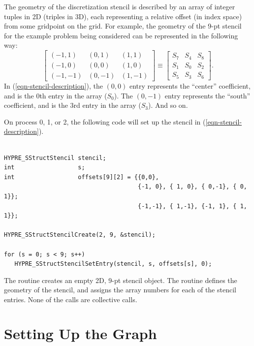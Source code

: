 The geometry of the discretization stencil is described by an array of
integer tuples in 2D (triples in 3D), each representing a relative
offset (in index space) from some gridpoint on the grid.  For example,
the geometry of the 9-pt stencil for the example problem being
considered can be represented in the following way:
\begin{equation}\label{sstruct:eqn-stencil-description}
\left [
\begin{array}{ccc}
(-1, 1) & ( 0, 1) & ( 1, 1) \\
(-1, 0) & ( 0, 0) & ( 1, 0) \\
(-1,-1) & ( 0,-1) & ( 1,-1) 
\end{array}
\right ]
\equiv
\left [
\begin{array}{ccc}
S_7 & S_4 & S_8 \\
S_1 & S_0 & S_2 \\
S_5 & S_3 & S_6
\end{array}
\right ] .
\end{equation}
In (\ref{eqn-stencil-description}), the $(0,0)$ entry represents the
``center'' coefficient, and is the 0th entry in the array ($S_0$).
The $(0,-1)$ entry represents the ``south'' coefficient, and is the
3rd entry in the array ($S_3$).  And so on.

On process 0, 1, or 2, the following code will set up the stencil in
(\ref{eqn-stencil-description}).
\begin{display}
\begin{verbatim}

HYPRE_SStructStencil stencil;
int                  s;
int                  offsets[9][2] = {{0,0},
                                      {-1, 0}, { 1, 0}, { 0,-1}, { 0, 1}};
                                      {-1,-1}, { 1,-1}, {-1, 1}, { 1, 1}};

HYPRE_SStructStencilCreate(2, 9, &stencil);

for (s = 0; s < 9; s++)
   HYPRE_SStructStencilSetEntry(stencil, s, offsets[s], 0);

\end{verbatim}
\end{display}
The  routine creates an empty 2D, 9-pt stencil object.
The  routine defines the geometry of the stencil, and
assigns the array numbers for each of the stencil entries.  None of
the calls are collective calls.


\section{Setting Up the Graph}
\label{sstruct:Setting Up the Graph}


